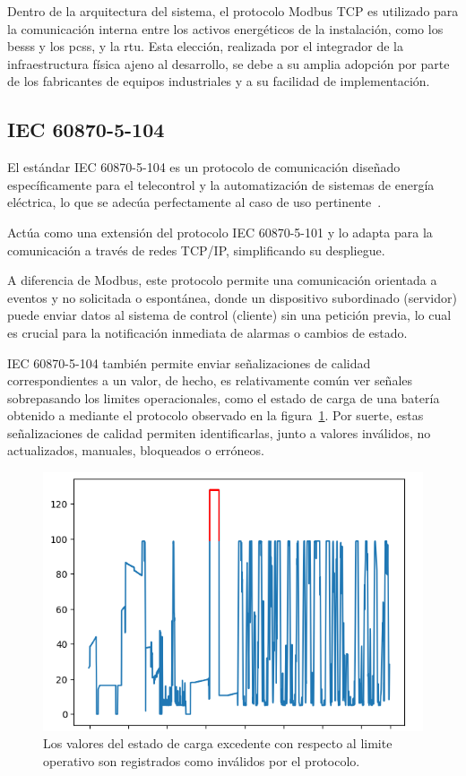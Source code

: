 Dentro de la arquitectura del sistema, el protocolo Modbus TCP es utilizado para la comunicación interna entre los activos energéticos de la instalación, como los \glspl{bess} y los \glspl{pcs}, y la \gls{rtu}. Esta elección, realizada por el integrador de la infraestructura física ajeno al desarrollo, se debe a su amplia adopción por parte de los fabricantes de equipos industriales y a su facilidad de implementación.

\subsection{IEC 60870{-}5{-}104}%
\label{makereference3.3.2}

El estándar IEC 60870{-}5{-}104 es un protocolo de comunicación diseñado específicamente para el telecontrol y la automatización de sistemas de energía eléctrica, lo que se adecúa perfectamente al caso de uso pertinente~\cite{iec2016telecontrol}.

Actúa como una extensión del protocolo IEC 60870{-}5{-}101 y lo adapta para la comunicación a través de redes TCP/IP, simplificando su despliegue.

A diferencia de Modbus, este protocolo permite una comunicación orientada a eventos y no solicitada o espontánea, donde un dispositivo subordinado (servidor) puede enviar datos al sistema de control (cliente) sin una petición previa, lo cual es crucial para la notificación inmediata de alarmas o cambios de estado.

IEC 60870{-}5{-}104 también permite enviar señalizaciones de calidad correspondientes a un valor, de hecho, es relativamente común ver señales sobrepasando los limites operacionales, como el estado de carga de una batería obtenido a mediante el protocolo observado en la figura~\ref{fig:overflow-soc}. Por suerte, estas señalizaciones de calidad permiten identificarlas, junto a valores inválidos, no actualizados, manuales, bloqueados o erróneos.

\begin{figure}
  \centering
  \includegraphics[width=0.5\linewidth]{figures/overflow-soc.png}
  \caption[Estado de carga excedente.]{Los valores del estado de carga excedente con respecto al limite operativo son registrados como inválidos por el protocolo.}%
  \label{fig:overflow-soc}
\end{figure}

